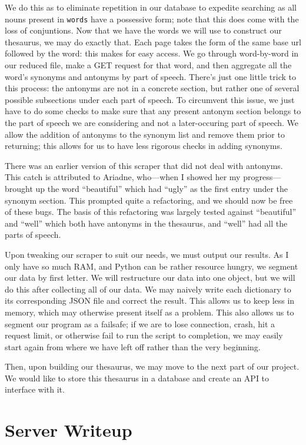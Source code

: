 \documentclass[11pt, twoside, reqno]{book}
\begin{document}
We do this as to eliminate repetition in our database to expedite searching as all nouns present in \texttt{words} have a possessive form; note that this does come with the loss of conjuntions. Now that we have the words we will use to construct our thesaurus, we may do exactly that. Each page takes the form of the same base url followed by the word: this makes for easy access. We go through word-by-word in our reduced file, make a GET request for that word, and then aggregate all the word's synonyms and antonyms by part of speech. There's just one little trick to this process: the antonyms are not in a concrete section, but rather one of several possible subsections under each part of speech. To circumvent this issue, we just have to do some checks to make sure that any present antonym section belongs to the part of speech we are considering and not a later-occuring part of speech. We allow the addition of antonyms to the synonym list and remove them prior to returning; this allows for us to have less rigorous checks in adding synonyms.

There was an earlier version of this scraper that did not deal with antonyms. This catch is attributed to Ariadne, who—when I showed her my progress—brought up the word ``beautiful'' which had ``ugly'' as the first entry under the synonym section. This prompted quite a refactoring, and we should now be free of these bugs. The basis of this refactoring was largely tested against ``beautiful'' and ``well'' which both have antonyms in the thesaurus, and ``well'' had all the parts of speech.

Upon tweaking our scraper to suit our needs, we must output our results. As I only have so much RAM, and Python can be rather resource hungry, we segment our data by first letter. We will restructure our data into one object, but we will do this after collecting all of our data. We may naively write each dictionary to its corresponding JSON file and correct the result. This allows us to keep less in memory, which may otherwise present itself as a problem. This also allows us to segment our program as a failsafe; if we are to lose connection, crash, hit a request limit, or otherwise fail to run the script to completion, we may easily start again from where we have left off rather than the very beginning.

Then, upon building our thesaurus, we may move to the next part of our project. We would like to store this thesaurus in a database and create an API to interface with it.

\chapter{Server Writeup}
\end{document}
